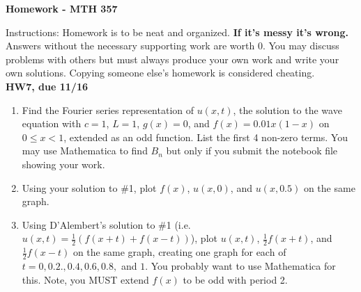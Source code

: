 \documentclass[10pt]{article}
\begin{document}
\begin{center}
{\Large\bf  Homework - MTH 357}\\
\vspace{.1in}


\end{center}

\noindent Instructions:  %
Homework is to be neat and organized.  \textbf{If it's messy it's wrong.} Answers without the necessary supporting work are worth 0.   You may discuss problems with others but must always produce your own work and write your own solutions.  Copying someone else's homework is considered cheating.\\



\noindent \textbf{HW7, due 11/16}
\begin{enumerate}
\item Find the Fourier series representation of $u(x,t)$, the solution to the wave equation with $c=1$, $L=1$, $g(x)=0$, and $f(x)=0.01x(1-x)$ on $0\le x< 1$, extended as an odd function. List the first 4 non-zero terms. You may use Mathematica to find $B_n$ but only if you submit the notebook file showing your work.
\item Using your solution to \#1, plot $f(x)$, $u(x,0)$, and $u(x,0.5)$ on the same graph.
\item Using D'Alembert's solution to \#1 (i.e. $u(x,t)=\frac{1}{2}(f(x+t)+f(x-t))$), plot $u(x,t)$, $\frac{1}{2}f(x+t)$, and $\frac{1}{2}f(x-t)$ on the same graph, creating one graph  for each of $t = 0, 0.2., 0.4, 0.6, 0.8,$ and $1.$  You probably want to use Mathematica for this. Note, you MUST extend $f(x)$ to be odd with period 2.
\end{enumerate}
\end{document}
